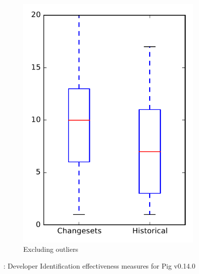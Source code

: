 \begin{figure}
\begin{subfigure}{.4\textwidth}
        \includegraphics[height=0.4\textheight]{figures/dit/rq2_pig_no_outlier}
        \caption{Excluding outliers}\label{fig:dit:rq2:pig_no_outlier}
    \end{subfigure}
\caption{\dtwo: Developer Identification effectiveness measures for Pig v0.14.0}
\label{fig:dit:rq2:pig}
\end{figure}
